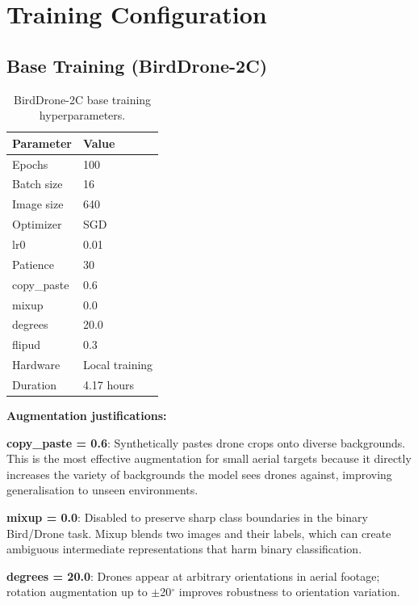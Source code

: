 \documentclass[12pt,a4paper]{report}
\begin{document}
\section{Training Configuration}

\subsection{Base Training (BirdDrone-2C)}

\begin{table}[H]
\centering
\caption{BirdDrone-2C base training hyperparameters.}
\begin{tabular}{|l|l|}
\hline
\textbf{Parameter} & \textbf{Value} \\
\hline
Epochs       & 100 \\
\hline
Batch size   & 16 \\
\hline
Image size   & 640 \\
\hline
Optimizer    & SGD \\
\hline
lr0          & 0.01 \\
\hline
Patience     & 30 \\
\hline
copy\_paste  & 0.6 \\
\hline
mixup        & 0.0 \\
\hline
degrees      & 20.0 \\
\hline
flipud       & 0.3 \\
\hline
Hardware     & Local training \\
\hline
Duration     & 4.17 hours \\
\hline
\end{tabular}
\end{table}

\textbf{Augmentation justifications:}

\textbf{copy\_paste = 0.6}: Synthetically pastes drone crops onto diverse
backgrounds. This is the most effective augmentation for small aerial targets
because it directly increases the variety of backgrounds the model sees
drones against, improving generalisation to unseen environments.

\textbf{mixup = 0.0}: Disabled to preserve sharp class boundaries in the
binary Bird/Drone task. Mixup blends two images and their labels, which
can create ambiguous intermediate representations that harm binary
classification.

\textbf{degrees = 20.0}: Drones appear at arbitrary orientations in aerial
footage; rotation augmentation up to $\pm$20$^\circ$ improves robustness
to orientation variation.
\end{document}
